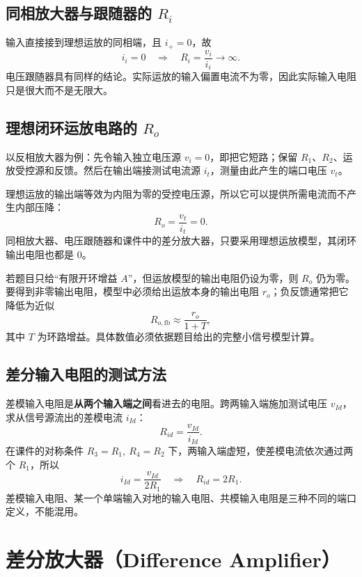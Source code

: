 \documentclass[11pt,fontset=none]{ctexart}
\begin{document}
\subsection{同相放大器与跟随器的 \texorpdfstring{$R_i$}{Ri}}

输入直接接到理想运放的同相端，且 $i_+=0$，故
\[
  i_i=0
  \quad\Rightarrow\quad
  \boxed{R_i=\frac{v_i}{i_i}\to\infty}.
\]
电压跟随器具有同样的结论。实际运放的输入偏置电流不为零，因此实际输入电阻只是很大而不是无限大。

\subsection{理想闭环运放电路的 \texorpdfstring{$R_o$}{Ro}}

以反相放大器为例：先令输入独立电压源 $v_i=0$，即把它短路；保留 $R_1$、$R_2$、运放受控源和反馈。然后在输出端接测试电流源 $i_t$，测量由此产生的端口电压 $v_t$。

理想运放的输出端等效为内阻为零的受控电压源，所以它可以提供所需电流而不产生内部压降：
\[
  \boxed{R_o=\frac{v_t}{i_t}=0}.
\]
同相放大器、电压跟随器和课件中的差分放大器，只要采用理想运放模型，其闭环输出电阻也都是 0。

\begin{warnbox}
若题目只给“有限开环增益 $A$”，但运放模型的输出电阻仍设为零，则 $R_o$ 仍为零。要得到非零输出电阻，模型中必须给出运放本身的输出电阻 $r_o$；负反馈通常把它降低为近似
\[
  R_{o,\mathrm{fb}}\approx\frac{r_o}{1+T},
\]
其中 $T$ 为环路增益。具体数值必须依据题目给出的完整小信号模型计算。
\end{warnbox}

\subsection{差分输入电阻的测试方法}

差模输入电阻是\textbf{从两个输入端之间}看进去的电阻。跨两输入端施加测试电压 $v_{Id}$，求从信号源流出的差模电流 $i_{Id}$：
\[
  \boxed{R_{id}=\frac{v_{Id}}{i_{Id}}}.
\]
在课件的对称条件 $R_3=R_1,\ R_4=R_2$ 下，两输入端虚短，使差模电流依次通过两个 $R_1$，所以
\[
  i_{Id}=\frac{v_{Id}}{2R_1}
  \quad\Rightarrow\quad
  \boxed{R_{id}=2R_1}.
\]
差模输入电阻、某一个单端输入对地的输入电阻、共模输入电阻是三种不同的端口定义，不能混用。

\section{差分放大器（Difference Amplifier）}
\end{document}
